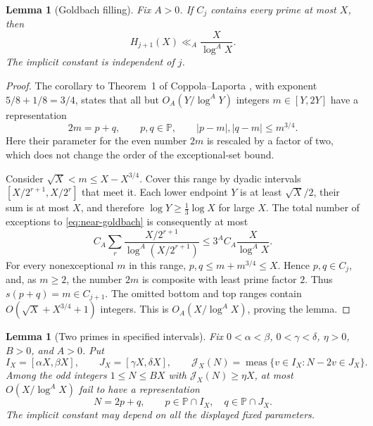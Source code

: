 \documentclass[11pt,letterpaper]{article}
\numberwithin{equation}{section}
\newtheorem{lemma}[theorem]{Lemma}
\theoremstyle{remark}
\DeclareMathOperator{\meas}{meas}
\newcommand{\Pp}{\mathbb P}
\begin{document}
\begin{lemma}[Goldbach filling]\label{lem:filling}
Fix $A>0$. If $C_j$ contains every prime at most $X$, then
\begin{equation}\label{eq:filling}
 H_{j+1}(X)\ll_A\frac{X}{\log^A X}.
\end{equation}
The implicit constant is independent of $j$.
\end{lemma}

\begin{proof}
The corollary to Theorem~1 of Coppola--Laporta
\cite[p.~246]{CL}, with exponent $5/8+1/8=3/4$, states that all but
$O_A(Y/\log^A Y)$ integers $m\in[Y,2Y]$ have a representation
\begin{equation}\label{eq:near-goldbach}
 2m=p+q,\qquad p,q\in\Pp,\qquad |p-m|,|q-m|\le m^{3/4}.
\end{equation}
Here their parameter for the even number $2m$ is rescaled by a factor
of two, which does not change the order of the exceptional-set bound.

Consider $\sqrt X<m\le X-X^{3/4}$. Cover this range by dyadic
intervals $[X/2^{r+1},X/2^r]$ that meet it. Each lower endpoint $Y$
is at least $\sqrt X/2$, their sum is at most $X$, and therefore
$\log Y\ge \tfrac13\log X$ for large $X$. The total number of
exceptions to \eqref{eq:near-goldbach} is consequently at most
\[
 C_A\sum_r\frac{X/2^{r+1}}{\log^A(X/2^{r+1})}
 \le 3^AC_A\frac{X}{\log^A X}.
\]
For every nonexceptional $m$ in this range,
$p,q\le m+m^{3/4}\le X$. Hence $p,q\in C_j$, and, as $m\ge2$,
the number $2m$ is composite with least prime factor $2$. Thus
$s(p+q)=m\in C_{j+1}$. The omitted bottom and top ranges contain
$O(\sqrt X+X^{3/4}+1)$ integers. This is $O_A(X/\log^A X)$,
proving the lemma.
\end{proof}

\begin{lemma}[Two primes in specified intervals]\label{lem:binary}
Fix $0<\alpha<\beta$, $0<\gamma<\delta$, $\eta>0$, $B>0$, and $A>0$.
Put
\[
 I_X=[\alpha X,\beta X],\qquad J_X=[\gamma X,\delta X],
 \qquad
 \mathcal J_X(N)=\meas\{v\in I_X:N-2v\in J_X\}.
\]
Among the odd integers $1\le N\le BX$ with
$\mathcal J_X(N)\ge\eta X$, at most $O(X/\log^A X)$ fail to have
a representation
\begin{equation}\label{eq:binary-rep}
 N=2p+q,\qquad p\in\Pp\cap I_X,\quad q\in\Pp\cap J_X.
\end{equation}
The implicit constant may depend on all the displayed fixed parameters.
\end{lemma}
\end{document}
